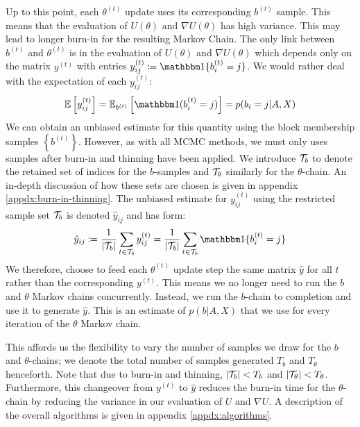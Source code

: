 Up to this point, each $\theta^{(t)}$ update uses its corresponding $b^{(t)}$ sample. This means that the evaluation of $U(\theta)$ and $\nabla U(\theta)$ has high variance. This may lead to longer burn-in for the resulting Markov Chain. The only link between $b^{(t)}$ and $\theta^{(t)}$ is in the evaluation of $U(\theta)$ and $\nabla U(\theta)$ which depends only on the matrix $y^{(t)}$ with entries $y_{ij}^{(t)} \coloneqq \one\{b_i^{(t)} = j\}$. We would rather deal with the expectation of each $y_{ij}^{(t)}$:
%
\begin{equation}
	\Expect \left[ y_{ij}^{(t)} \right] = \Expect_{b^{(t)}} \left[ \one(b_{i}^{(t)} = j) \right]
	= p(b_i = j | A, X)
\end{equation}
%
We can obtain an unbiased estimate for this quantity using the block membership samples $\left\{ b^{(t)} \right\}$. However, as with all MCMC methods, we must only uses samples after burn-in and thinning have been applied. We introduce $\mathcal{T}_b$ to denote the retained set of indices for the $b$-samples and $\mathcal{T}_\theta$ similarly for the $\theta$-chain. An in-depth discussion of how these sets are chosen is given in appendix \ref{appdx:burn-in-thinning}. The unbiased estimate for $y_{ij}^{(t)}$ using the restricted sample set $\mathcal{T}_b$ is denoted $\hat{y}_{ij}$ and has form:
%
\begin{equation}
	\hat{y}_{ij} \coloneqq \frac{1}{|\Tcal_b|} \sum_{t \in \Tcal_b} y_{ij}^{(t)} = \frac{1}{|\Tcal_b|} \sum_{t \in \Tcal_b} \one\{b_i^{(t)} = j\}
\end{equation}
%
We therefore, choose to feed each $\theta^{(t)}$ update step the same matrix $\hat{y}$ for all $t$ rather than the corresponding $y^{(t)}$. This means we no longer need to run the $b$ and $\theta$ Markov chains concurrently. Instead, we run the $b$-chain to completion and use it to generate $\hat{y}$. This is an estimate of $p(b | A, X)$ that we use for every iteration of the $\theta$ Markov chain.

This affords us the flexibility to vary the number of samples we draw for the $b$ and $\theta$-chains; we denote the total number of samples generated $T_b$ and $T_\theta$ henceforth. Note that due to burn-in and thinning, $|\mathcal{T}_b| < T_b$ and $|\mathcal{T}_\theta| < T_\theta$. Furthermore, this changeover from $y^{(t)}$ to $\hat{y}$ reduces the burn-in time for the $\theta$-chain by reducing the variance in our evaluation of $U$ and $\nabla U$. A description of the overall algorithms is given in appendix \ref{appdx:algorithms}.

